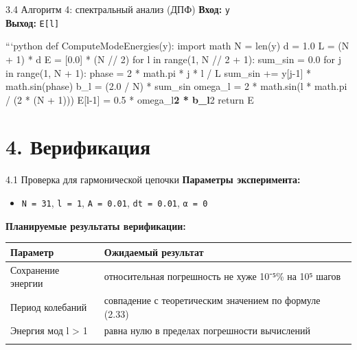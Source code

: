 \documentclass[
  ignorenonframetext,
  aspectratio=169,
  russian,
]{beamer}
\providecommand{\tightlist}{%
  \setlength{\itemsep}{0pt}\setlength{\parskip}{0pt}}\usepackage{longtable,booktabs,array}
\begin{document}
\begin{frame}[fragile]{3.4 Алгоритм 4: спектральный анализ (ДПФ)}
\label{ux430ux43bux433ux43eux440ux438ux442ux43c-4-ux441ux43fux435ux43aux442ux440ux430ux43bux44cux43dux44bux439-ux430ux43dux430ux43bux438ux437-ux434ux43fux444}
\textbf{Вход:} \texttt{y}\\
\textbf{Выход:} \texttt{E{[}l{]}}

```python def ComputeModeEnergies(y): import math N = len(y) d = 1.0 L =
(N + 1) * d E = {[}0.0{]} * (N // 2) for l in range(1, N // 2 + 1):
sum\_sin = 0.0 for j in range(1, N + 1): phase = 2 * math.pi * j * l / L
sum\_sin += y{[}j-1{]} * math.sin(phase) b\_l = (2.0 / N) * sum\_sin
omega\_l = 2 * math.sin(l * math.pi / (2 * (N + 1))) E{[}l-1{]} = 0.5 *
omega\_l\textbf{2 * b\_l}2 return E
\end{frame}

\section{4. Верификация}\label{ux432ux435ux440ux438ux444ux438ux43aux430ux446ux438ux44f}

\begin{frame}[fragile]{4.1 Проверка для гармонической цепочки}
\label{ux43fux440ux43eux432ux435ux440ux43aux430-ux434ux43bux44f-ux433ux430ux440ux43cux43eux43dux438ux447ux435ux441ux43aux43eux439-ux446ux435ux43fux43eux447ux43aux438}
\textbf{Параметры эксперимента:}

\begin{itemize}[<+->]
\tightlist
\item
  \texttt{N\ =\ 31}, \texttt{l\ =\ 1}, \texttt{A\ =\ 0.01},
  \texttt{dt\ =\ 0.01}, \texttt{α\ =\ 0}
\end{itemize}

\textbf{Планируемые результаты верификации:}

\begin{longtable}[]{@{}
  >{\raggedright\arraybackslash}p{}
  >{\raggedright\arraybackslash}p{}@{}}
\toprule\noalign{}
\begin{minipage}[b]{\linewidth}\raggedright
Параметр
\end{minipage} & \begin{minipage}[b]{\linewidth}\raggedright
Ожидаемый результат
\end{minipage} \\
\midrule\noalign{}
\endhead
Сохранение энергии & относительная погрешность не хуже 10⁻⁵\% на 10⁵
шагов \\
Период колебаний & совпадение с теоретическим значением по формуле
(2.33) \\
Энергия мод l \textgreater{} 1 & равна нулю в пределах погрешности
вычислений \\
\bottomrule\noalign{}
\end{longtable}
\end{frame}
\end{document}
